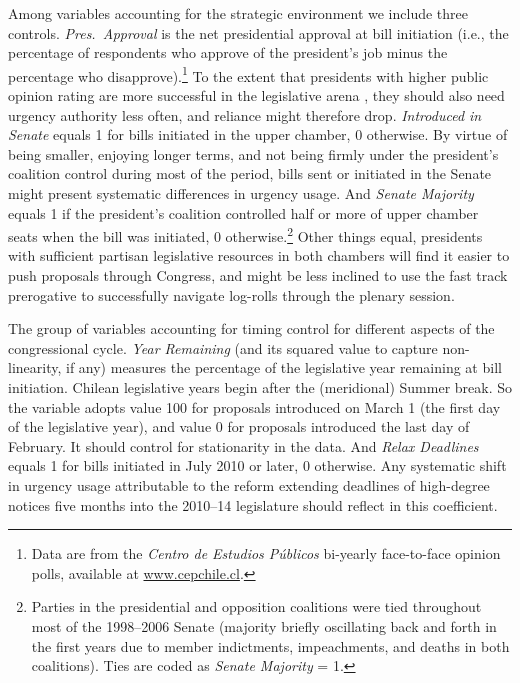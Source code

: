 \documentclass[letter,12pt]{article}
\begin{document}
Among variables accounting for the strategic environment we include three controls. \emph{Pres.~Approval} is the net presidential approval at bill initiation (i.e., the percentage of respondents who approve of the president's job minus the percentage who disapprove).\footnote{Data are from the \emph{Centro de Estudios Públicos} bi-yearly face-to-face opinion polls, available at \url{www.cepchile.cl}.} To the extent that presidents with higher public opinion rating are more successful in the legislative arena \citep{bond.fleisher.1990,aleman.navia.UrgChi.2009}, they should also need urgency authority less often, and reliance might therefore drop. \emph{Introduced in Senate} equals 1 for bills initiated in the upper chamber, 0 otherwise. By virtue of being smaller, enjoying longer terms, and not being firmly under the president's coalition control during most of the period, bills sent or initiated in the Senate might present systematic differences in urgency usage. And \emph{Senate Majority} equals 1 if the president's coalition controlled half or more of upper chamber seats when the bill was initiated, 0 otherwise.\footnote{Parties in the presidential and opposition coalitions were tied throughout most of the 1998--2006 Senate (majority briefly oscillating back and forth in the first years due to member indictments, impeachments, and deaths in both coalitions). Ties are coded as \emph{Senate Majority} = 1.} Other things equal, presidents with sufficient partisan legislative resources in both chambers will find it easier to push proposals through Congress, and might be less inclined to use the fast track prerogative to successfully navigate log-rolls through the plenary session.

The group of variables accounting for timing control for different aspects of the congressional cycle. \emph{Year Remaining} (and its squared value to capture non-linearity, if any) measures the percentage of the legislative year remaining at bill initiation. Chilean legislative years begin after the (meridional) Summer break. So the variable adopts value 100 for proposals introduced on March 1 (the first day of the legislative year), and value 0 for proposals introduced the last day of February. It should control for stationarity in the data. And \emph{Relax Deadlines} equals 1 for bills initiated in July 2010 or later, 0 otherwise. Any systematic shift in urgency usage attributable to the reform extending deadlines of high-degree notices five months into the 2010--14 legislature should reflect in this coefficient. 
\end{document}
